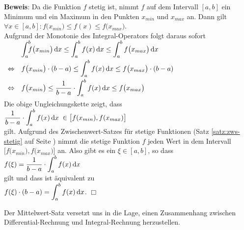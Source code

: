\noindent
\textbf{Beweis}: Da die Funktion $f$ stetig ist, nimmt $f$ auf dem Intervall $[a,b]$ ein
Minimum und ein Maximum in den Punkten $x_{min}$ und $x_{max}$ an.  Dann gilt 
\\[0.2cm]
\hspace*{1.3cm}
$\forall x \in [a,b]: f\bigl(x_{min}\bigr) \leq f(x) \leq f\bigl(x_{max}\bigr)$.
\\[0.2cm]
Aufgrund der Monotonie des Integral-Operators folgt daraus sofort 
\\[0.2cm]
\hspace*{1.3cm}
$
\begin{array}{cl} 
                & \dint{a}{b} f\bigl(x_{min}\bigr)\, \dr x \leq \int_a^b f(x)\, \dr x \leq \int_a^b f\bigl(x_{max}\bigr)\,\dr x \\[0.3cm]
\Leftrightarrow & \ds f\bigl(x_{min}\bigr) \cdot  (b-a) \leq \int_a^b f(x)\, \dr x \leq f\bigl(x_{max}\bigr)\cdot (b-a) \\[0.3cm]
\Leftrightarrow & \ds f\bigl(x_{min}\bigr) \leq \frac{1}{b-a} \cdot \int_a^b f(x)\, \dr x \leq f\bigl(x_{max}\bigr) \\[0.3cm]
\end{array}
$
\\[0.2cm]
Die obige Ungleichungskette zeigt, dass 
\\[0.2cm]
\hspace*{1.3cm}
 $\displaystyle \frac{1}{b-a} \cdot \int_a^b f(x)\, \textrm{d} x\; \in \bigl[f(x_{min}), f(x_{max})\bigr]$ \\[0.2cm]
gilt.  
Aufgrund des Zwischenwert-Satzes f\"ur stetige Funktionen (Satz \ref{satz:zws-stetig} auf Seite
\pageref{satz:zws-stetig}) nimmt die stetige Funktion $f$ jeden Wert in dem  
Intervall $\bigl[f\bigl(x_{min}\bigr), f\bigl(x_{max}\bigr)\bigr]$ an.  
Also gibt es ein $\xi \in [a,b]$, so dass 
\\[0.2cm]
\hspace*{1.3cm}
$f(\xi) = \displaystyle \frac{1}{b-a} \cdot \int_a^b f(x)\, \textrm{d} x$
\\[0.2cm]
gilt und dass ist \"aquivalent zu 
\\[0.2cm]
\hspace*{1.3cm}
$\displaystyle f(\xi) \cdot  (b- a) = \int_a^b f(x)\, \textrm{d} x$. \hspace*{\fill} $\Box$
\vspace*{0.3cm}

\noindent
Der Mittelwert-Satz versetzt uns in die Lage, einen Zusammenhang zwischen
Differential-Rechnung und Integral-Rechnung herzustellen.

